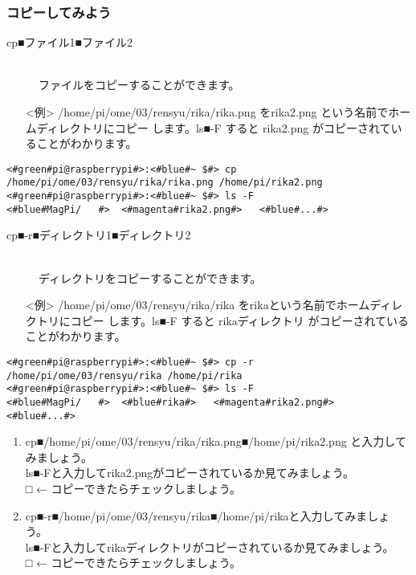 \subsubsection{コピーしてみよう}
\begin{description}
\item[cp■ファイル1■ファイル2]\mbox{}\\
ファイルをコピーすることができます。
\end{description}
\begin{itemize}
\item[<例>]/home/pi/ome/03/rensyu/rika/rika.png をrika2.png という名前でホームディレクトリにコピー
します。ls■-F すると rika2.png がコピーされていることがわかります。
\end{itemize}
\begin{lstlisting}[caption=cpの例, label=cp]
<#green#pi@raspberrypi#>:<#blue#~ $#> cp /home/pi/ome/03/rensyu/rika/rika.png /home/pi/rika2.png
<#green#pi@raspberrypi#>:<#blue#~ $#> ls -F
<#blue#MagPi/	#>	<#magenta#rika2.png#>	<#blue#...#>
\end{lstlisting}
\begin{description}
\item[cp■-r■ディレクトリ1■ディレクトリ2]\mbox{}\\
ディレクトリをコピーすることができます。
\end{description}
\begin{itemize}
\item[<例>]/home/pi/ome/03/rensyu/rika/rika をrikaという名前でホームディレクトリにコピー
します。ls■-F すると rikaディレクトリ がコピーされていることがわかります。
\end{itemize}
\begin{lstlisting}[caption=cp -rの例, label=cp-R]
<#green#pi@raspberrypi#>:<#blue#~ $#> cp -r /home/pi/ome/03/rensyu/rika /home/pi/rika
<#green#pi@raspberrypi#>:<#blue#~ $#> ls -F
<#blue#MagPi/	#>	<#blue#rika#>	<#magenta#rika2.png#>	<#blue#...#>
\end{lstlisting}
\begin{tcolorbox}[title=\useOmetoi]
\begin{enumerate}
\item cp■/home/pi/ome/03/rensyu/rika/rika.png■/home/pi/rika2.png と入力してみましょう。\\ls■-Fと入力してrika2.pngがコピーされているか見てみましょう。\\□ ← コピーできたらチェックしましょう。
\item cp■-r■/home/pi/ome/03/rensyu/rika■/home/pi/rikaと入力してみましょう。\\ls■-Fと入力してrikaディレクトリがコピーされているか見てみましょう。\\□ ← コピーできたらチェックしましょう。
\end{enumerate}
\end{tcolorbox}